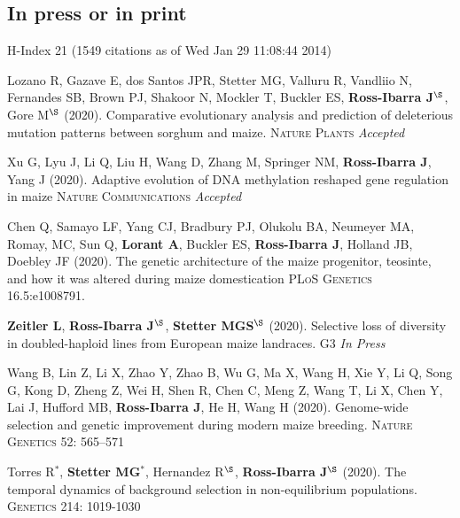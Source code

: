 \documentclass[letterpaper,10pt]{article}
\begin{document}
\subsection*{In press or in print} %
H-Index 21 {\small(1549 citations as of Wed Jan 29 11:08:44 2014)}
\begin{etaremune}
\setlength\itemsep{0ex}

\item Lozano R, Gazave E, dos Santos JPR, Stetter MG, Valluru R, Vandliio N, Fernandes SB, Brown PJ, Shakoor N, Mockler T, Buckler ES, \textbf{Ross-Ibarra J}$^\S$, Gore M$^\S$ (2020). Comparative evolutionary analysis and prediction of deleterious mutation patterns between sorghum and maize. \textsc{Nature Plants} \textit{Accepted} %

\item Xu G, Lyu J, Li Q, Liu H, Wang D, Zhang M, Springer NM, \textbf{Ross-Ibarra J}, Yang J (2020). Adaptive evolution of DNA methylation reshaped gene regulation in maize \textsc{Nature Communications} \textit{Accepted}

\item Chen Q, Samayo LF, Yang CJ, Bradbury PJ, Olukolu BA, Neumeyer MA, Romay, MC, Sun Q, \textbf{Lorant A}, Buckler ES, \textbf{Ross-Ibarra J}, Holland JB, Doebley JF (2020).
The genetic architecture of the maize progenitor, teosinte, and how it was altered during maize domestication \textsc{PLoS Genetics} 16.5:e1008791.

\item \textbf{Zeitler L}, \textbf{Ross-Ibarra J}$^\S$, \textbf{Stetter MGS}$^\S$ (2020). Selective loss of diversity in doubled-haploid lines from European maize landraces. \textsc{G3} \textit{In Press}

\item Wang B, Lin Z, Li X, Zhao Y, Zhao B, Wu G, Ma X, Wang H, Xie Y, Li Q, Song G, Kong D, Zheng Z, Wei H, Shen R, Chen C, Meng Z, Wang T, Li X, Chen Y, Lai J, Hufford MB, \textbf{Ross-Ibarra J}, He H, Wang H (2020). Genome-wide selection and genetic improvement during modern maize breeding. \textsc{Nature  Genetics} 52: 565–571

\item Torres R$^*$, \textbf{Stetter MG}$^*$, Hernandez R$^\S$, \textbf{Ross-Ibarra J}$^\S$ (2020). The temporal dynamics of background selection in non-equilibrium populations. \textsc{Genetics} 214: 1019-1030


\end{etaremune}
\end{document}
